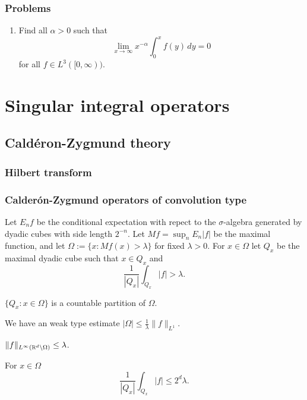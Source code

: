 \documentclass{../../large}
\begin{document}
\section*{Problems}
\begin{enumerate}
\item Find all $\alpha>0$ such that
\[\lim_{x\to\infty}x^{-\alpha}\int_0^xf(y)\,dy=0\]
for all $f\in L^3([0,\infty))$.
\end{enumerate}











\chapter{}




\part{Singular integral operators}
\chapter{Cald\'eron-Zygmund theory}

\section{Hilbert transform}

\section{Calder\'on-Zygmund operators of convolution type}
\begin{prb}
Let $E_nf$ be the conditional expectation with repect to the $\sigma$-algebra generated by dyadic cubes with side length $2^{-n}$.
Let $Mf=\sup_nE_n|f|$ be the maximal function, and let $\Omega:=\{x:Mf(x)>\lambda\}$ for fixed $\lambda>0$.
For $x\in\Omega$ let $Q_x$ be the maximal dyadic cube such that $x\in Q_x$ and
\[\frac1{|Q_x|}\int_{Q_x}|f|>\lambda.\]
\begin{parts}
\item
$\{Q_x:x\in\Omega\}$ is a countable partition of $\Omega$.
\item
We have an weak type estimate $|\Omega|\le\frac1\lambda\|f\|_{L^1}$.
\item
$\|f\|_{L^\infty(\mathbb{R}^d\setminus\Omega)}\le\lambda$.
\item
For $x\in\Omega$
\[\frac1{|Q_x|}\int_{Q_x}|f|\le2^d\lambda.\]
\end{parts}
\end{prb}
\end{document}
